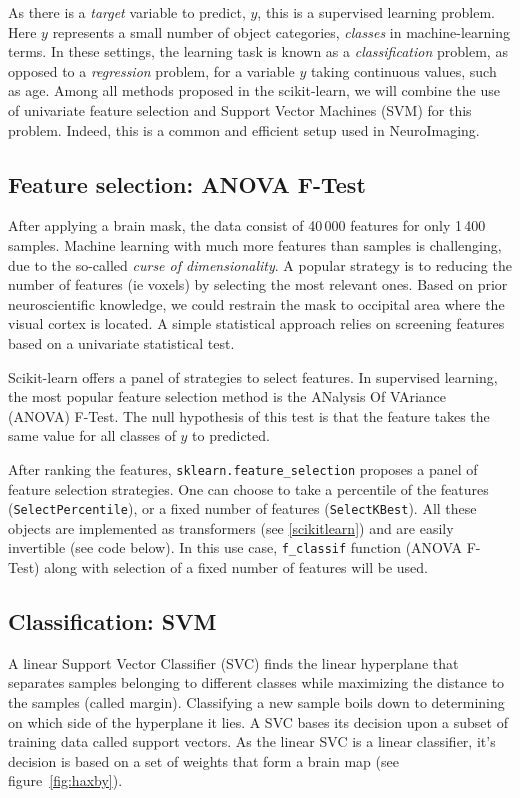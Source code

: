 \documentclass{frontiersSCNS} %
\begin{document}
As there is a \emph{target} variable to predict, $y$, this is a supervised
learning problem. Here $y$ represents a small number of object categories,
\emph{classes} in machine-learning terms. In these settings, the learning
task is known as a \emph{classification} problem, as opposed to a
\emph{regression} problem, for a variable $y$ taking continuous values,
such as age.
Among all methods proposed in the scikit-learn, we will
combine the use of univariate feature selection and Support Vector
Machines (SVM) for this problem. Indeed, this is a common and efficient
setup used in NeuroImaging.

\subsection{Feature selection: ANOVA F-Test}

After applying a brain mask, the data consist of 40\,000 features for 
only 1\,400 samples. Machine learning with much more features than samples
is challenging, due to the so-called \emph{curse of dimensionality}.
A popular strategy is to reducing the number of features (ie voxels) by
selecting the most relevant ones. Based on prior neuroscientific
knowledge, we could restrain the mask to occipital area where the visual
cortex is located. A simple statistical approach relies on screening
features based on a univariate statistical test.

Scikit-learn offers a panel of strategies to select features. In supervised
learning, the most popular feature selection method is the
ANalysis Of VAriance (ANOVA) F-Test. 
The null hypothesis of this test is that the feature takes the same value
for all classes of $y$ to predicted.

After ranking the features, \verb!sklearn.feature_selection! proposes a panel
of feature selection strategies. One can choose to take a percentile of the features
(\verb!SelectPercentile!), or a fixed number of features (\verb!SelectKBest!).
All these objects are implemented as transformers (see
\ref{scikitlearn}) and are easily invertible (see code below).
In this use case, \verb!f_classif! function (ANOVA F-Test) along with selection
of a fixed number of features will be used.

\subsection{Classification: SVM}

A linear Support Vector Classifier (SVC) finds the linear hyperplane that
separates samples belonging to different classes while maximizing the
distance to the samples (called margin). Classifying a new sample boils
down to determining on which side of the hyperplane it lies. A SVC bases
its decision upon a subset of training data called support vectors. As
the linear SVC is a linear classifier, it's decision is based on a set of
weights that form a brain map (see figure~\ref{fig:haxby}).
\end{document}
